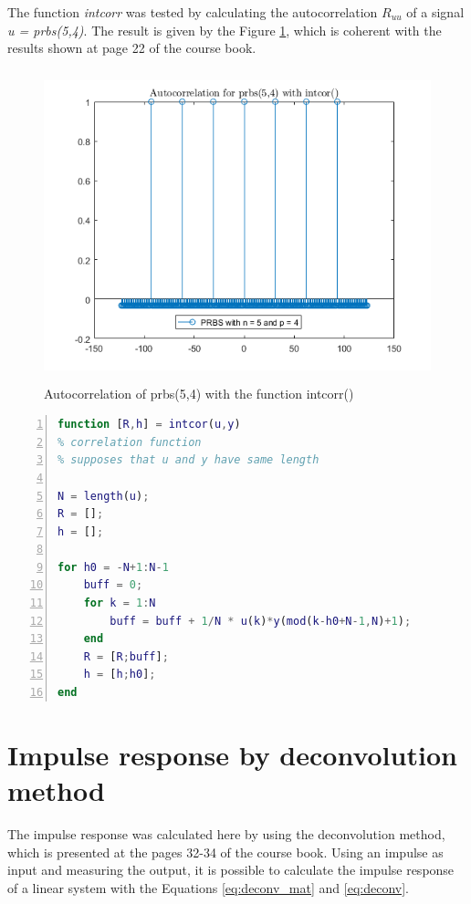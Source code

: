 \documentclass[a4paper,11pt]{article}
\begin{document}
The function \textit{intcorr} was tested by calculating the autocorrelation $R_{uu}$ of a signal \textit{u = prbs(5,4)}. The result is given by the Figure \ref{fig:autocorr}, which is coherent with the results shown at page 22 of the course book.

\begin{figure}[H]
	\centering
    \includegraphics[height=9cm]{images/autocorr_prbs54}
    \caption{Autocorrelation of prbs(5,4) with the function intcorr()}
    \label{fig:autocorr}
\end{figure}



\begin{lstlisting}[language=Matlab,numbers=left,caption=intcor.m,label=lst:intcor]
function [R,h] = intcor(u,y)
% correlation function
% supposes that u and y have same length

N = length(u);
R = [];
h = [];

for h0 = -N+1:N-1
    buff = 0;
    for k = 1:N
        buff = buff + 1/N * u(k)*y(mod(k-h0+N-1,N)+1);
    end
    R = [R;buff];
    h = [h;h0];
end
\end{lstlisting}



\section{Impulse response by deconvolution method}

The impulse response was calculated here by using the deconvolution method, which is presented at the pages 32-34 of the course book. Using an impulse as input and measuring the output, it is possible to calculate the impulse response of a linear system with the Equations \ref{eq:deconv_mat} and \ref{eq:deconv}.
\end{document}
